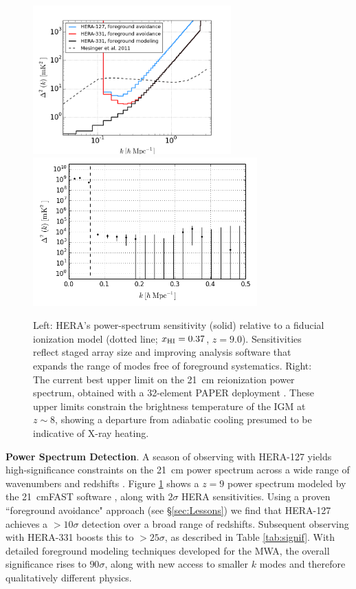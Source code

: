 \documentclass[preprint]{aastex}
\newcommand{\Mycitep}[1]{{\bf \citep{#1}}}
\newcommand{\Caption}[4]{\vspace{#1}\renewcommand{\baselinestretch}{#2}\caption{#4}\vspace{#3}}
\def\HI{{H{\small I }}}
\def\xHI{{x_{\rm\HI}}}
\begin{document}
\begin{figure}[t]\centering
\includegraphics[height=2.25in]{plots/Pspec/eor_pspec_2014.png}
\includegraphics[height=2.25in]{plots/Pspec/pk_k3pk.png} %
\Caption{-0.1in}{0.9}{-0.2in}{\small Left: HERA's power-spectrum sensitivity (solid)
relative to a fiducial ionization model (dotted line; $\xHI=0.37$, $z=9.0$).
Sensitivities reflect staged array size and
improving analysis software that expands the range
of modes free of foreground systematics.
Right: The current best upper limit on the 21~cm reionization power spectrum,
obtained with a 32-element PAPER deployment \Mycitep{parsons_et_al2013}.  These upper limits
constrain the brightness temperature of the IGM at $z\sim8$, showing
a departure from adiabatic cooling presumed to be indicative of X-ray heating.
}\label{fig:eor_pspec}
\end{figure}

{\bf Power Spectrum Detection}. A season of observing with HERA-127 yields high-significance constraints on the 21~cm power
spectrum across a wide range of wavenumbers and redshifts \citep{pober_et_al2014}.  
Figure \ref{fig:eor_pspec} shows a $z=9$ power spectrum modeled by the 21~cmFAST software \citep{mesinger_et_al2011},
along with $2\sigma$ HERA sensitivities.  Using a proven ``foreground avoidance" approach (see \S\ref{sec:Lessons})
we find that
HERA-127 achieves a $> 10\sigma$ detection over a broad range of redshifts.
Subsequent observing with HERA-331 boosts this to $>25\sigma$, as described in Table \ref{tab:signif}.  With detailed foreground modeling techniques
developed for the MWA, the overall significance rises to $90\sigma$,
along with new access to smaller $k$ modes and therefore qualitatively different physics.
\end{document}
